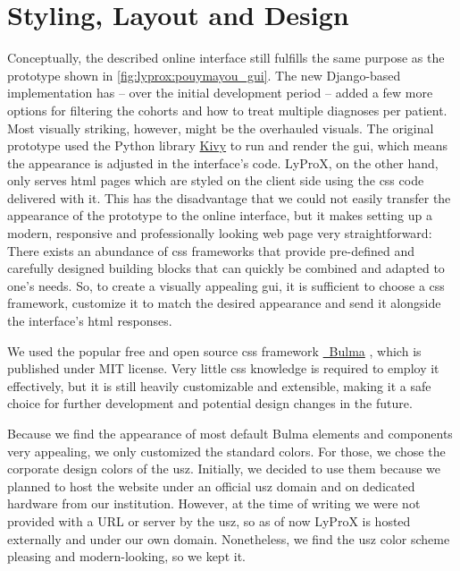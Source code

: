 \documentclass[\relativeRoot/main.tex]{subfiles}
\begin{document}
\section{Styling, Layout and Design}
\label{sec:lyprox:design}

Conceptually, the described online interface still fulfills the same purpose as the prototype shown in \cref{fig:lyprox:pouymayou_gui}. The new Django-based implementation has -- over the initial development period -- added a few more options for filtering the cohorts and how to treat multiple diagnoses per patient. Most visually striking, however, might be the overhauled visuals. The original prototype used the Python library \href{https://kivy.org}{Kivy} to run and render the \gls{gui}, which means the appearance is adjusted in the interface's code. LyProX, on the other hand, only serves \acrshort{html} pages which are styled on the client side using the \gls{css} code delivered with it. This has the disadvantage that we could not easily transfer the appearance of the prototype to the online interface, but it makes setting up a modern, responsive and professionally looking web page very straightforward: There exists an abundance of \gls{css} frameworks that provide pre-defined and carefully designed building blocks that can quickly be combined and adapted to one's needs. So, to create a visually appealing \gls{gui}, it is sufficient to choose a \gls{css} framework, customize it to match the desired appearance and send it alongside the interface's \acrshort{html} responses.

We used the popular free and open source \gls{css} framework \href{https://bulma.io}{~Bulma} \cite{thomas_bulma_2021}, which is published under MIT license. Very little \gls{css} knowledge is required to employ it effectively, but it is still heavily customizable and extensible, making it a safe choice for further development and potential design changes in the future.

Because we find the appearance of most default Bulma elements and components very appealing, we only customized the standard colors. For those, we chose the corporate design colors of the \gls{usz}. Initially, we decided to use them because we planned to host the website under an official \gls{usz} domain and on dedicated hardware from our institution. However, at the time of writing we were not provided with a URL or server by the \gls{usz}, so as of now LyProX is hosted externally and under our own domain. Nonetheless, we find the \gls{usz} color scheme pleasing and modern-looking, so we kept it.
\end{document}
